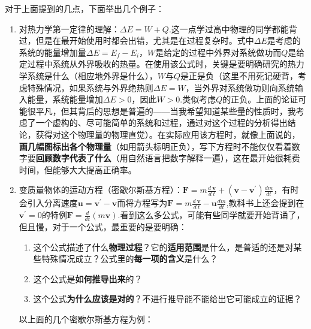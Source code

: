 \documentclass{ctexart}
\begin{document}
\begin{myexample}
  对于上面提到的几点，下面举出几个例子：
  \begin{enumerate}[leftmargin=*, labelsep=0.5em]
    \item 对热力学第一定律的理解：$\Delta E = W + Q$.这一点学过高中物理的同学都能背过，但是在最开始使用时都会出错，尤其是在过程复杂时。式中$\Delta E$是考虑的系统的能量增加量$\Delta E = E_{f} - E_{i}$，$W$是给定的过程中外界对系统做功而$Q$是给定过程中系统从外界吸收的热量。在使用该公式时，关键是要明确研究的热力学系统是什么（相应地外界是什么），$W$与$Q$是正是负（这里不用死记硬背，考虑特殊情况，如果系统与外界绝热则$\Delta E = W$，当外界对系统做功则向系统输入能量，系统能量增加$\Delta E > 0$，因此$W > 0$.类似考虑$Q$的正负。上面的论证可能很平凡，但其背后的思想是普遍的——当我希望知道某些量的性质时，我考虑了一个虚构的、尽可能简单的系统和过程，通过对这个过程的分析得出结论，获得对这个物理量的物理直觉）。在实际应用该方程时，就像上面说的，\textbf{画几幅图标出各个物理量}（如用箭头标明正负），写下方程时不能仅仅看着数字要\textbf{回顾数字代表了什么}（用自然语言把数字解释一遍），这在最开始很耗费时间，但能够大大提高正确率。
    
    \item 变质量物体的运动方程（密歇尔斯基方程）：$\mathbf{F} = m\frac{d\ \mathbf{v}}{d\ t} + \left( \mathbf{v} - \mathbf{v}^{'} \right)\frac{dm}{dt}$，有时会引入分离速度$\mathbf{u} = \mathbf{v}^{'} - \mathbf{v}$而将方程写为$\mathbf{F} = m\frac{d\ \mathbf{v}}{d\ t} - \mathbf{u}\frac{dm}{dt}$,教科书上还会提到在$\mathbf{v}^{'} = 0$的特例$\mathbf{F} = \frac{d}{dt}(m\mathbf{v})$.看到这么多公式，可能有些同学就要开始背诵了，但且慢，对于一个公式，最重要的是要明确：
    
    \begin{enumerate}[leftmargin=*, labelsep=0.5em]
      \item 这个公式描述了什么\textbf{物理过程}？它的\textbf{适用范围}是什么，是普适的还是对某些特殊情况成立？公式里的\textbf{每一项的含义}是什么？
      
      \item 这个公式是\textbf{如何推导出来}的？
      
      \item 这个公式\textbf{为什么应该是对的}？不进行推导能不能给出它可能成立的证据？
    \end{enumerate}
    
    以上面的几个密歇尔斯基方程为例：
    

\end{enumerate}
\end{myexample}
\end{document}
